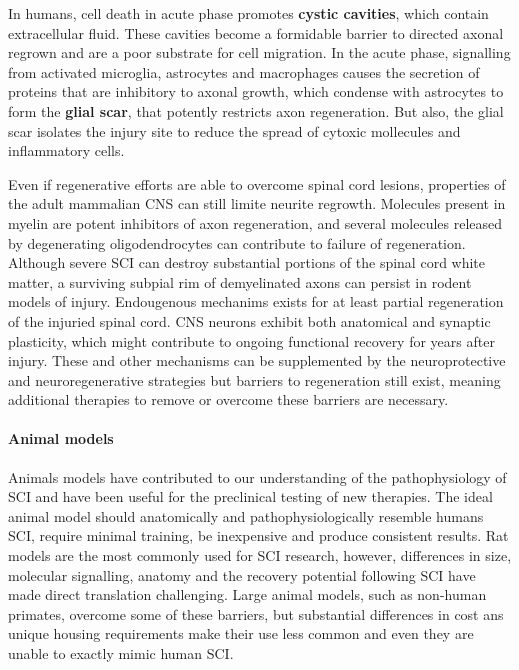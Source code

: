 \documentclass[12pt,article,oneside,a4paper]{memoir}
\begin{document}
In humans, cell death in acute phase promotes \textbf{cystic cavities}, which contain extracellular fluid. These cavities become a formidable barrier to directed axonal regrown and are a poor substrate for cell migration. In the acute phase, signalling from activated microglia, astrocytes and macrophages causes the secretion of proteins that are inhibitory to axonal growth, which condense with astrocytes to form the \textbf{glial scar}, that potently restricts axon regeneration. But also, the glial scar isolates the injury site to reduce the spread of cytoxic mollecules and inflammatory cells.

Even if regenerative efforts are able to overcome spinal cord lesions, properties of the adult mammalian CNS can still limite neurite regrowth. Molecules present in myelin are potent inhibitors of axon regeneration, and several molecules released by degenerating oligodendrocytes can contribute to failure of regeneration. 
Although severe SCI can destroy substantial portions of the spinal cord white matter, a surviving subpial rim of demyelinated axons can persist in rodent models of injury. Endougenous mechanims exists for at least partial regeneration of the injuried spinal cord. CNS neurons exhibit both anatomical and synaptic plasticity, which might contribute to ongoing functional recovery for years after injury. These and other mechanisms can be supplemented by the neuroprotective and neuroregenerative strategies but barriers to regeneration still exist, meaning additional therapies to remove or overcome these barriers are necessary.

\paragraph{Animal models} Animals models have contributed to our understanding of the pathophysiology of SCI and have been useful for the preclinical testing of new therapies. The ideal animal model should anatomically and pathophysiologically resemble humans SCI, require minimal training, be inexpensive and produce consistent results. Rat models are the most commonly used for SCI research, however, differences in size, molecular signalling, anatomy and the recovery potential following SCI have made direct translation challenging. Large animal models, such as non-human primates, overcome some of these barriers, but substantial differences in cost ans unique housing requirements make their use less common and even they are unable to exactly mimic human SCI.
\end{document}
